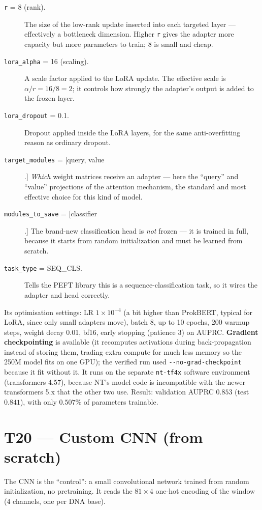 \documentclass{article}
\begin{document}
\begin{description}
\item[\texttt{r} = 8 (rank).] The size of the low-rank update inserted into each targeted layer --- effectively a bottleneck dimension. Higher \texttt{r} gives the adapter more capacity but more parameters to train; 8 is small and cheap.
\item[\texttt{lora\_alpha} = 16 (scaling).] A scale factor applied to the LoRA update. The effective scale is $\alpha / r = 16/8 = 2$; it controls how strongly the adapter's output is added to the frozen layer.
\item[\texttt{lora\_dropout} = 0.1.] Dropout applied inside the LoRA layers, for the same anti-overfitting reason as ordinary dropout.
\item[\texttt{target\_modules} = [query, value].] \emph{Which} weight matrices receive an adapter --- here the ``query'' and ``value'' projections of the attention mechanism, the standard and most effective choice for this kind of model.
\item[\texttt{modules\_to\_save} = [classifier].] The brand-new classification head is \emph{not} frozen --- it is trained in full, because it starts from random initialization and must be learned from scratch.
\item[\texttt{task\_type} = SEQ\_CLS.] Tells the PEFT library this is a sequence-classification task, so it wires the adapter and head correctly.
\end{description}

\noindent Its optimisation settings: LR $1\times10^{-4}$ (a bit higher than ProkBERT, typical for LoRA, since only small adapters move), batch 8, up to 10 epochs, 200 warmup steps, weight decay 0.01, bf16, early stopping (patience 3) on AUPRC. \textbf{Gradient checkpointing} is available (it recomputes activations during back-propagation instead of storing them, trading extra compute for much less memory so the 250M model fits on one GPU); the verified run used \texttt{-{}-no-grad-checkpoint} because it fit without it. It runs on the separate \texttt{nt-tf4x} software environment (transformers 4.57), because NT's model code is incompatible with the newer transformers 5.x that the other two use. Result: validation AUPRC $0.853$ (test $0.841$), with only $0.507\%$ of parameters trainable.

\section{T20 --- Custom CNN (from scratch)}
The CNN is the ``control'': a small convolutional network trained from random initialization, no pretraining. It reads the $81\times4$ one-hot encoding of the window (4 channels, one per DNA base).
\end{document}
